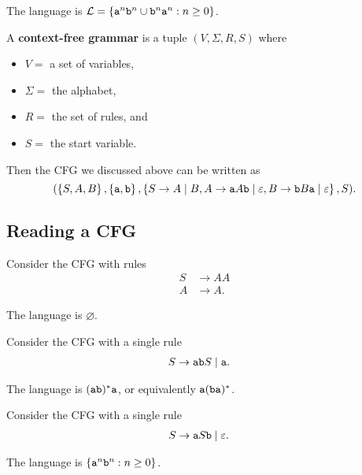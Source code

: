 \documentclass{notes}
\begin{document}
The language is $\mathcal L = \left \{ \verb~a~^n \verb~b~^n \cup \verb~b~^n \verb~a~^n : n \geq 0 \right \}$.

\newpage

\begin{defn}
  A {\boldmath \bfseries context-free grammar} is a tuple $(V, \Sigma, R, S)$ where
  \begin{itemize}
    \item $V = $ a set of variables,  

    \item $\Sigma = $ the alphabet,  

    \item $R = $ the set of rules, and  

    \item $S = $ the start variable.
  \end{itemize}
\end{defn}

Then the CFG we discussed above can be written as 
\[
  (\left \{ S, A, B \right \}, \left \{ \verb~a~, \verb~b~ \right \}, \left \{ S \to A \; | \; B, A \to \verb~a~ A \verb~b~ \; | \; \varepsilon, B \to \verb~b~ B \verb~a~ \; | \; \varepsilon \right \}, S).
\]

\newpage

\subsection{Reading a CFG}

\begin{eg}
  Consider the CFG with rules
  \begin{align*}
    S &\to A A \\ 
    A &\to A.
  \end{align*}
  
  The language is $\varnothing$.
\end{eg}

\begin{eg}
  Consider the CFG with a single rule 
  \begin{align*}
    S &\to \verb~ab~ S \; | \; \verb~a~.
  \end{align*}
  
  The language is $(\verb~ab~)^* \verb~a~$, or equivalently $\verb~a~ (\verb~ba~)^*$.
\end{eg}

\begin{eg}
  Consider the CFG with a single rule 
  \begin{align*}
    S &\to \verb~a~ S \verb~b~ \; | \; \varepsilon.
  \end{align*}
  
  The language is $\left \{ \verb~a~^n \verb~b~^n : n \geq 0 \right \}$.
\end{eg}
\end{document}
